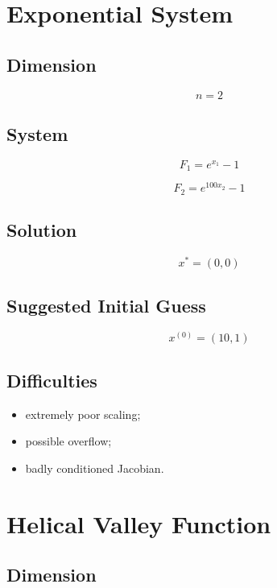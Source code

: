 \documentclass[11pt,a4paper]{article}
\begin{document}
\section{Exponential System}

\subsection*{Dimension}

\[
n=2
\]

\subsection*{System}

\[
F_1=e^{x_1}-1
\]

\[
F_2=e^{100x_2}-1
\]

\subsection*{Solution}

\[
x^*=(0,0)
\]

\subsection*{Suggested Initial Guess}

\[
x^{(0)}=(10,1)
\]

\subsection*{Difficulties}

\begin{itemize}
  \item extremely poor scaling;
  \item possible overflow;
  \item badly conditioned Jacobian.
\end{itemize}

\section{Helical Valley Function}

\subsection*{Dimension}
\end{document}
